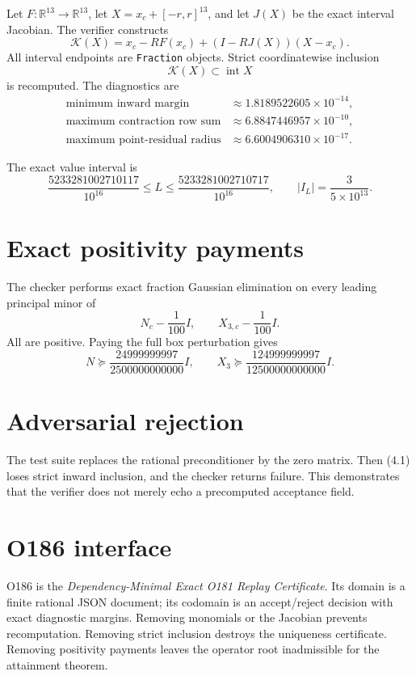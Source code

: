\documentclass[11pt,a4paper,openany]{report}
\newcommand{\R}{\mathbb R}
\begin{document}
Let \(F:\R^{13}\to\R^{13}\), let
\(X=x_c+[-r,r]^{13}\), and let \(J(X)\) be the exact interval Jacobian.
The verifier constructs
\[
 \mathcal K(X)=x_c-RF(x_c)+(I-RJ(X))(X-x_c).                         \tag{4.1}
\]
All interval endpoints are \texttt{Fraction} objects. Strict coordinatewise
inclusion
\[
 \mathcal K(X)\subset\operatorname{int}X
\]
is recomputed. The diagnostics are
\begin{align*}
\text{minimum inward margin}&\approx1.8189522605\times10^{-14},\\
\text{maximum contraction row sum}&\approx6.8847446957\times10^{-10},\\
\text{maximum point-residual radius}&\approx6.6004906310\times10^{-17}.
\end{align*}

The exact value interval is
\[
 \frac{5233281002710117}{10^{16}}
 \le L\le
 \frac{5233281002710717}{10^{16}},
 \qquad |I_L|=\frac3{5\times10^{13}}.                              \tag{4.2}
\]

\section{Exact positivity payments}

The checker performs exact fraction Gaussian elimination on every leading
principal minor of
\[
 N_c-\frac1{100}I,
 \qquad X_{3,c}-\frac1{100}I.
\]
All are positive. Paying the full box perturbation gives
\[
 N\succeq\frac{24999999997}{2500000000000}I,
 \qquad
 X_3\succeq\frac{124999999997}{12500000000000}I.                   \tag{4.3}
\]

\section{Adversarial rejection}

The test suite replaces the rational preconditioner by the zero matrix. Then
(4.1) loses strict inward inclusion, and the checker returns failure. This
demonstrates that the verifier does not merely echo a precomputed acceptance
field.

\section{O186 interface}

O186 is the \emph{Dependency-Minimal Exact O181 Replay Certificate}. Its
domain is a finite rational JSON document; its codomain is an accept/reject
decision with exact diagnostic margins. Removing monomials or the Jacobian
prevents recomputation. Removing strict inclusion destroys the uniqueness
certificate. Removing positivity payments leaves the operator root
inadmissible for the attainment theorem.
\end{document}

